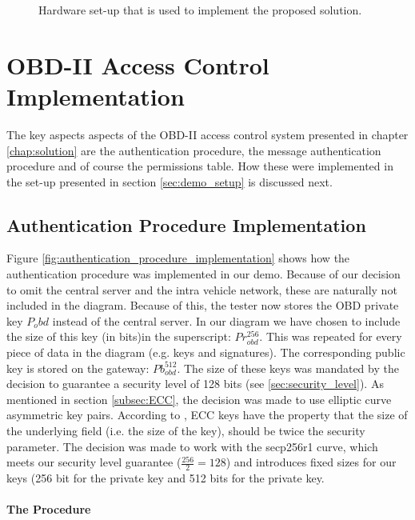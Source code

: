 \begin{figure}[h]
	\label{fig:demo}
	\caption{Hardware set-up that is used to implement the proposed solution.}
\end{figure}

\section{OBD-II Access Control Implementation}
The key aspects aspects of the OBD-II access control system presented in chapter \ref{chap:solution} are the authentication procedure, the message authentication procedure and of course the permissions table. How these were implemented in the set-up presented in section \ref{sec:demo_setup} is discussed next. 

\subsection{Authentication Procedure Implementation}
\label{subsec:authentication_procedure_implementation}

Figure \ref{fig:authentication_procedure_implementation} shows how the authentication procedure was implemented in our demo. Because of our decision to omit the central server and the intra vehicle network, these are naturally not included in the diagram. Because of this, the tester now stores the OBD private key $P_obd$ instead of the central server. In our diagram we have chosen to include the size of this key (in bits)in the superscript: $Pr_{obd}^{256}$. This was repeated for every piece of data in the diagram (e.g. keys and signatures). The corresponding public key is stored on the gateway: $Pb_{obd}^{512}$. The size of these keys was mandated by the decision to guarantee a security level of 128 bits (see \ref{sec:security_level}). As mentioned in section \ref{subsec:ECC}, the decision was made to use elliptic curve asymmetric key pairs. According to \cite{wiki:ECC}, ECC keys have the property that the size of the underlying field (i.e. the size of the key), should be twice the security parameter. The decision was made to work with the secp256r1 curve, which meets our security level guarantee ($\frac{256}{2}=128$) and introduces fixed sizes for our keys (256 bit for the private key and 512 bits for the private key.

\paragraph{The Procedure}

